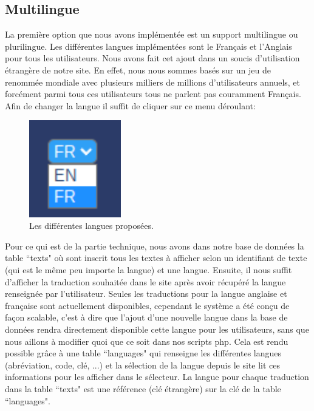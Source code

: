 \documentclass[a4paper,11pt]{article}
\begin{document}
\subsection{Multilingue}
La première option que nous avons implémentée est un support multilingue ou plurilingue. Les différentes langues implémentées sont le Français et l'Anglais pour tous les utilisateurs. Nous avons fait cet ajout dans un soucis d'utilisation étrangère de notre site. En effet, nous nous sommes basés sur un jeu de renommée mondiale avec plusieurs milliers de millions d'utilisateurs annuels, et forcément parmi tous ces utilisateurs tous ne parlent pas couramment Français.\\

Afin de changer la langue il suffit de cliquer sur ce menu déroulant:
\begin{figure}[!h]
\centerline{\includegraphics[width=4cm]{images/menuLangues.PNG}}
\caption{Les différentes langues proposées.}
\label{fig}
\end{figure}

Pour ce qui est de la partie technique, nous avons dans notre base de données la table ``texts" où sont inscrit tous les textes à afficher selon un identifiant de texte (qui est le même peu importe la langue) et une langue. Ensuite, il nous suffit d'afficher la traduction souhaitée dans le site après avoir récupéré la langue renseignée par l'utilisateur. Seules les traductions pour la langue anglaise et française sont actuellement disponibles, cependant le système a été conçu de façon scalable, c'est à dire que l'ajout d'une nouvelle langue dans la base de données rendra directement disponible cette langue pour les utilisateurs, sans que nous aillons à modifier quoi que ce soit dans nos scripts php. Cela est rendu possible grâce à une table ``languages" qui renseigne les différentes langues (abréviation, code, clé, ...) et la sélection de la langue depuis le site lit ces informations pour les afficher dans le sélecteur. La langue pour chaque traduction dans la table  ``texts" est une référence (clé étrangère) sur la clé de la table ``languages".
\end{document}
